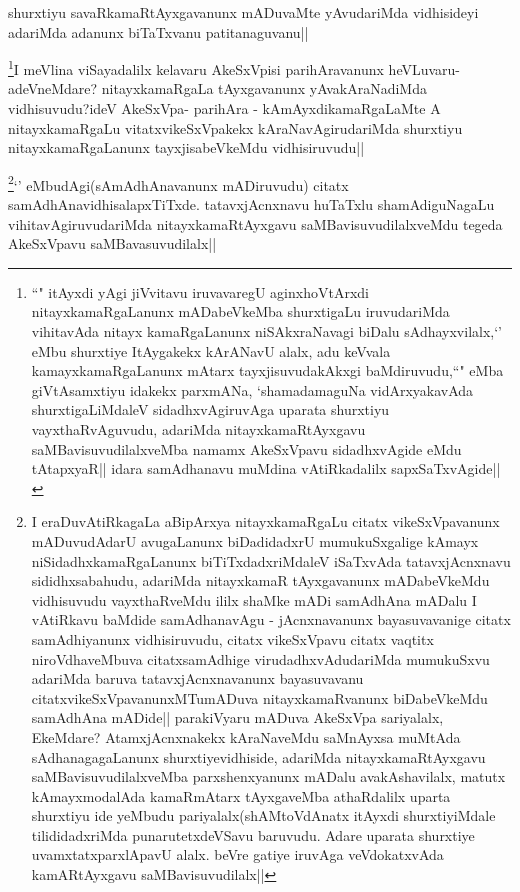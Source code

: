 
\begin{artha}
shurxtiyu savaRkamaRtAyxgavanunx mADuvaMte yAvudariMda vidhisideyi adariMda adanunx biTaTxvanu patitanaguvanu||
\end{artha}


\begin{artha}
\footnote{``\stext" itAyxdi yAgi jiVvitavu iruvavaregU aginxhoVtArxdi nitayxkamaRgaLanunx mADabeVkeMba shurxtigaLu iruvudariMda vihitavAda nitayx kamaRgaLanunx niSAkxraNavagi biDalu sAdhayxvilalx,`\stext' eMbu shurxtiye ItAygakekx kArANavU alalx, adu keVvala kamayxkamaRgaLanunx mAtarx tayxjisuvudakAkxgi baMdiruvudu,``\stext" eMba giVtAsamxtiyu idakekx parxmANa, `shamadamaguNa vidArxyakavAda shurxtigaLiMdaleV sidadhxvAgiruvAga uparata shurxtiyu vayxthaRvAguvudu, adariMda nitayxkamaRtAyxgavu saMBavisuvudilalxveMba namamx AkeSxVpavu sidadhxvAgide eMdu tAtapxyaR|| idara samAdhanavu muMdina vAtiRkadalilx sapxSaTxvAgide||}I meVlina viSayadalilx kelavaru AkeSxVpisi parihAravanunx heVLuvaru-adeVneMdare? nitayxkamaRgaLa tAyxgavanunx yAvakAraNadiMda vidhisuvudu?ideV AkeSxVpa- parihAra - kAmAyxdikamaRgaLaMte A nitayxkamaRgaLu vitatxvikeSxVpakekx kAraNavAgirudariMda shurxtiyu nitayxkamaRgaLanunx tayxjisabeVkeMdu vidhisiruvudu||
\end{artha}

\begin{artha}
\footnote{I eraDuvAtiRkagaLa aBipArxya nitayxkamaRgaLu citatx vikeSxVpavanunx mADuvudAdarU avugaLanunx biDadidadxrU mumukuSxgalige kAmayx niSidadhxkamaRgaLanunx biTiTxdadxriMdaleV iSaTxvAda tatavxjAcnxnavu sididhxsabahudu, adariMda nitayxkamaR tAyxgavanunx mADabeVkeMdu vidhisuvudu vayxthaRveMdu ililx shaMke mADi samAdhAna  mADalu I vAtiRkavu baMdide samAdhanavAgu - jAcnxnavanunx bayasuvavanige citatx samAdhiyanunx vidhisiruvudu, citatx vikeSxVpavu citatx vaqtitx niroVdhaveMbuva citatxsamAdhige virudadhxvAdudariMda mumukuSxvu adariMda baruva tatavxjAcnxnavanunx bayasuvavanu citatxvikeSxVpavanunxMTumADuva nitayxkamaRvanunx biDabeVkeMdu samAdhAna mADide|| parakiVyaru mADuva AkeSxVpa sariyalalx, EkeMdare? AtamxjAcnxnakekx kAraNaveMdu saMnAyxsa muMtAda sAdhanagagaLanunx shurxtiyevidhiside, adariMda nitayxkamaRtAyxgavu saMBavisuvudilalxveMba parxshenxyanunx mADalu avakAshavilalx, matutx kAmayxmodalAda kamaRmAtarx tAyxgaveMba athaRdalilx uparta shurxtiyu ide yeMbudu pariyalalx(shAMtoVdAnatx itAyxdi shurxtiyiMdale tilididadxriMda punarutetxdeVSavu baruvudu. Adare uparata shurxtiye uvamxtatxparxlApavU alalx. beVre gatiye iruvAga veVdokatxvAda kamARtAyxgavu saMBavisuvudilalx||}`\stext' eMbudAgi(sAmAdhAnavanunx mADiruvudu) citatx samAdhAnavidhisalapxTiTxde. tatavxjAcnxnavu huTaTxlu shamAdiguNagaLu vihitavAgiruvudariMda nitayxkamaRtAyxgavu saMBavisuvudilalxveMdu tegeda AkeSxVpavu saMBavasuvudilalx||
\end{artha}

